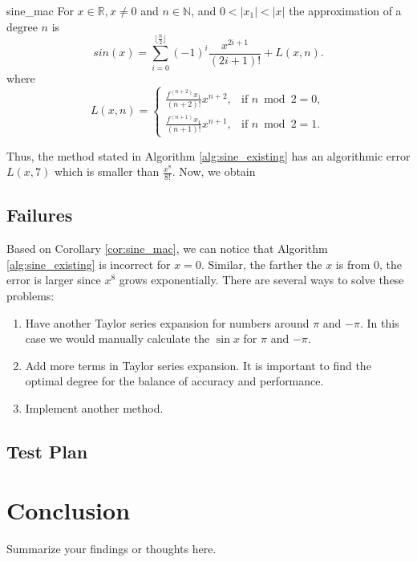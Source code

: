 \documentclass[12pt]{article}
\begin{document}
\begin{CorollaryColor}{}{sine_mac}
    For $x \in \mathbb{R}, x\neq 0$ and $n \in \mathbb{N}$, and $0 < |x_1| < |x|$
    the approximation of a degree $n$ is
    \begin{equation*}
        sin(x) = \sum_{i=0}^{\lfloor\frac{n}{2}\rfloor}
        \left(-1\right)^{ i} \frac{x^{2i + 1}}{(2i+1)!}   +  L(x, n).
    \end{equation*}
    where
    \begin{equation*}
        L(x, n) = \begin{cases}
            \frac{f^{(n + 2)}x_1}{(n+2)!}x^{n+2}, & \text{if } n \bmod 2 = 0,  \\
            \frac{f^{(n + 1)}x_1}{(n+1)!}x^{n+1}, & \text{if } n \bmod 2 = 1.
          \end{cases}
    \end{equation*}
\end{CorollaryColor}
Thus, the method stated in Algorithm \ref{alg:sine_existing} has an algorithmic error $L(x, 7)$ which is smaller than $\frac{x^8}{8!}$.
Now, we obtain
\subsection{Failures}
Based on Corollary \ref{cor:sine_mac}, we can notice that Algorithm \ref{alg:sine_existing} is incorrect for $x = 0$.
Similar, the farther the $x$ is from 0, the error is larger since $x^8$ grows exponentially.
There are several ways to solve these problems:
\begin{enumerate}
    \item Have another Taylor series expansion for numbers around $\pi$ and $-\pi$. In this case we would manually calculate the $\sin x$ for $\pi$ and $-\pi$.
    \item  Add more terms in Taylor series expansion. It is important to find the optimal degree for the balance of accuracy and performance.
    \item Implement another method.
\end{enumerate}
\subsection{Test Plan}

\section{Conclusion}
Summarize your findings or thoughts here.
\cite{apostol1985mathematical}



\end{document}
